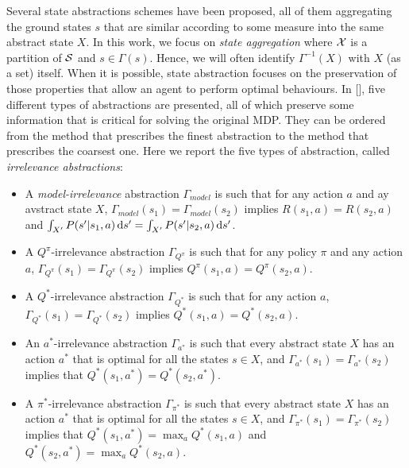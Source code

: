 \newline
Several state abstractions schemes have been proposed, all of them aggregating the ground states $s$ that are similar according to some measure into the same abstract state $X$. In this work, we focus on \textit{state aggregation} where $\mathcal{X}$ is a partition of $\mathcal{S}$ and $s\in\Gamma(s)$. Hence, we will often identify $\Gamma^{-1}(X)$ with $X$ (as a set) itself. When it is possible, state abstraction focuses on the preservation of those properties that allow an agent to perform optimal behaviours. In [\cite{lihong2006towards}], five different types of abstractions are presented, all of which preserve some information that is critical for solving the original \ac{MDP}. They can be ordered from the method that prescribes the finest abstraction to the method that prescribes the coarsest one. Here we report the five types of abstraction, called \emph{irrelevance abstractions}:
\begin{itemize}
	\item A \emph{model-irrelevance} abstraction $\Gamma_{model}$ is such that for any action $a$ and ay avstract state $X$, $\Gamma_{model}(s_1) = \Gamma_{model}(s_2)$ implies $R(s_1,a)=R(s_2,a)$ and $\int_{X'}P(s'|s_1,a) \,\mathrm{d} s'= \int_{X'}P(s'|s_2,a) \,\mathrm{d} s'$.
	\item A $Q^{\pi}$-irrelevance abstraction $\Gamma_{Q^{\pi}}$ is such that for any policy $\pi$ and any action $a$, $\Gamma_{Q^{\pi}}(s_1) = \Gamma_{Q^{\pi}}(s_2)$ implies $Q^{\pi}(s_1,a)=Q^{\pi}(s_2,a)$.
	\item A $Q^{*}$-irrelevance abstraction $\Gamma_{Q^{*}}$ is such that for any action $a$, $\Gamma_{Q^{*}}(s_1) = \Gamma_{Q^{*}}(s_2)$ implies $Q^{*}(s_1,a)=Q^{*}(s_2,a)$.
	\item An $a^{*}$-irrelevance abstraction $\Gamma_{a^{*}}$ is such that every abstract state $X$ has an action $a^{*}$ that is optimal for all the states $s \in X$, and $\Gamma_{a^{*}}(s_1) = \Gamma_{a^{*}}(s_2)$ implies that $Q^{*}(s_1,a^{*})=Q^{*}(s_2,a^{*})$.
	\item A $\pi^{*}$-irrelevance abstraction $\Gamma_{\pi^{*}}$ is such that every abstract state $X$ has an action $a^{*}$ that is optimal for all the states $s \in X$, and $\Gamma_{\pi^{*}}(s_1) = \Gamma_{\pi^{*}}(s_2)$ implies that $Q^{*}(s_1,a^{*})=\max_{a}Q^{*}(s_1,a)$ and $Q^{*}(s_2,a^{*})=\max_{a}Q^{*}(s_2,a)$.
\end{itemize}

